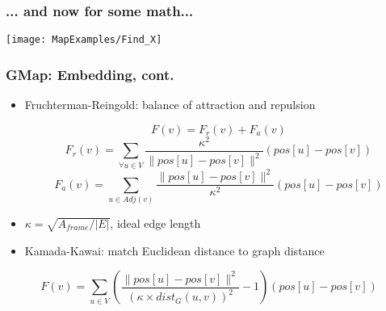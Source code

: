 \documentclass{beamer}
\begin{document}
\begin{frame}[plain]\frametitle{... and now for some math...}

\begin{center}
\texttt{[image: MapExamples/Find\_X]}
\end{center}
\end{frame}

\begin{frame}[plain]\frametitle{GMap: Embedding, cont.}

\begin{itemize}
\item Fruchterman-Reingold: balance of attraction and repulsion

\begin{block}{}
$$F(v)=F_r(v)+F_a(v)$$
$$F_r(v)=\sum_{\forall u\in V}\frac{\kappa^2}{\|pos[u]-pos[v]\|^2}(pos[u]-pos[v])$$
$$F_a(v)=\sum_{u\in Adj(v)}\frac{\|pos[u]-pos[v]\|^2}{\kappa^2}(pos[u]-pos[v])$$
\end{block}

\item $\kappa=\sqrt{A_{frame}/|E|}$, ideal edge length

\item Kamada-Kawai: match Euclidean distance to graph distance
\end{itemize}
\begin{block}{}$$ F(v)=\sum_{u\in V}\left( \frac{\|pos[u]-pos[v]\|^2}{(\kappa\times dist_G(u,v))^2} -1 \right)(pos[u]-pos[v])$$\end{block}

\end{frame}
\end{document}
